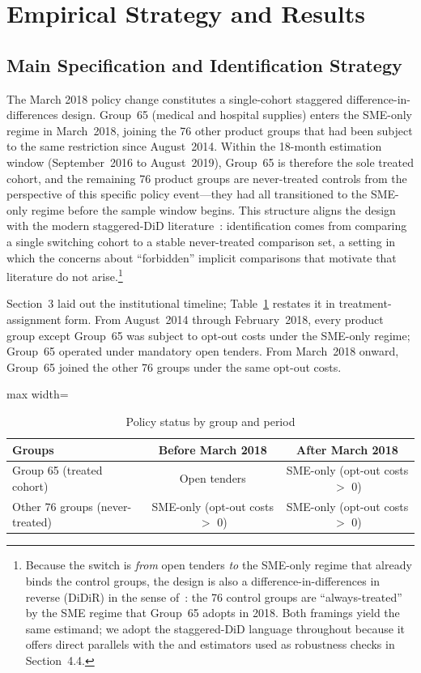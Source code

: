 \section{Empirical Strategy and Results}

\subsection{Main Specification and Identification Strategy}
The March 2018 policy change constitutes a single-cohort staggered difference-in-differences design. Group~65 (medical and hospital supplies) enters the SME-only regime in March~2018, joining the 76 other product groups that had been subject to the same restriction since August~2014. Within the 18-month estimation window (September~2016 to August~2019), Group~65 is therefore the sole treated cohort, and the remaining 76 product groups are never-treated controls from the perspective of this specific policy event---they had all transitioned to the SME-only regime before the sample window begins. This structure aligns the design with the modern staggered-DiD literature~\citep{callaway2021,sun2021,goodmanbacon2021,borusyak2024,dechaisemartin2020,roth2023}: identification comes from comparing a single switching cohort to a stable never-treated comparison set, a setting in which the concerns about ``forbidden'' implicit comparisons that motivate that literature do not arise.\footnote{Because the switch is \emph{from} open tenders \emph{to} the SME-only regime that already binds the control groups, the design is also a difference-in-differences in reverse (DiDiR) in the sense of~\citet{kim2019}: the 76 control groups are ``always-treated'' by the SME regime that Group~65 adopts in 2018. Both framings yield the same estimand; we adopt the staggered-DiD language throughout because it offers direct parallels with the \citet{callaway2021} and \citet{sun2021} estimators used as robustness checks in Section~4.4.}

Section~3 laid out the institutional timeline; Table~\ref{tab:groups} restates it in treatment-assignment form. From August~2014 through February~2018, every product group except Group~65 was subject to opt-out costs under the SME-only regime; Group~65 operated under mandatory open tenders. From March~2018 onward, Group~65 joined the other 76 groups under the same opt-out costs.

\begin{table}[htbp]
\centering
\caption{Policy status by group and period}
\label{tab:groups}
\begin{adjustbox}{max width=\textwidth}
\begin{tabular}{lcc}
\toprule
Groups & Before March 2018 & After March 2018 \\
\midrule
Group 65 (treated cohort)        & Open tenders         & SME-only (opt-out costs $>$ 0) \\
Other 76 groups (never-treated)  & SME-only (opt-out costs $>$ 0) & SME-only (opt-out costs $>$ 0) \\
\bottomrule
\end{tabular}
\end{adjustbox}
\end{table}

